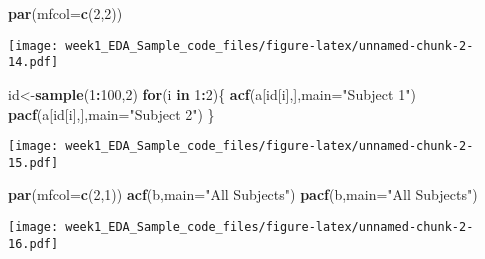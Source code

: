 \documentclass[]{article}
\newenvironment{Shaded}{\begin{snugshade}}{\end{snugshade}}
\newcommand{\ControlFlowTok}[1]{\textcolor[rgb]{0.13,0.29,0.53}{\textbf{#1}}}
\newcommand{\DataTypeTok}[1]{\textcolor[rgb]{0.13,0.29,0.53}{#1}}
\newcommand{\DecValTok}[1]{\textcolor[rgb]{0.00,0.00,0.81}{#1}}
\newcommand{\KeywordTok}[1]{\textcolor[rgb]{0.13,0.29,0.53}{\textbf{#1}}}
\newcommand{\NormalTok}[1]{#1}
\newcommand{\OperatorTok}[1]{\textcolor[rgb]{0.81,0.36,0.00}{\textbf{#1}}}
\newcommand{\StringTok}[1]{\textcolor[rgb]{0.31,0.60,0.02}{#1}}
\begin{document}
\begin{Shaded}
\begin{Highlighting}[]
\KeywordTok{par}\NormalTok{(}\DataTypeTok{mfcol=}\KeywordTok{c}\NormalTok{(}\DecValTok{2}\NormalTok{,}\DecValTok{2}\NormalTok{))}
\end{Highlighting}
\end{Shaded}

\texttt{[image: week1\_EDA\_Sample\_code\_files/figure-latex/unnamed-chunk-2-14.pdf]}

\begin{Shaded}
\begin{Highlighting}[]
\NormalTok{id<-}\KeywordTok{sample}\NormalTok{(}\DecValTok{1}\OperatorTok{:}\DecValTok{100}\NormalTok{,}\DecValTok{2}\NormalTok{)}
\ControlFlowTok{for}\NormalTok{(i }\ControlFlowTok{in} \DecValTok{1}\OperatorTok{:}\DecValTok{2}\NormalTok{)\{}
  \KeywordTok{acf}\NormalTok{(a[id[i],],}\DataTypeTok{main=}\StringTok{"Subject 1"}\NormalTok{)}
  \KeywordTok{pacf}\NormalTok{(a[id[i],],}\DataTypeTok{main=}\StringTok{"Subject 2"}\NormalTok{)}
\NormalTok{\}}
\end{Highlighting}
\end{Shaded}

\texttt{[image: week1\_EDA\_Sample\_code\_files/figure-latex/unnamed-chunk-2-15.pdf]}

\begin{Shaded}
\begin{Highlighting}[]
\KeywordTok{par}\NormalTok{(}\DataTypeTok{mfcol=}\KeywordTok{c}\NormalTok{(}\DecValTok{2}\NormalTok{,}\DecValTok{1}\NormalTok{))}
\KeywordTok{acf}\NormalTok{(b,}\DataTypeTok{main=}\StringTok{"All Subjects"}\NormalTok{)}
\KeywordTok{pacf}\NormalTok{(b,}\DataTypeTok{main=}\StringTok{"All Subjects"}\NormalTok{)}
\end{Highlighting}
\end{Shaded}

\texttt{[image: week1\_EDA\_Sample\_code\_files/figure-latex/unnamed-chunk-2-16.pdf]}
\end{document}
